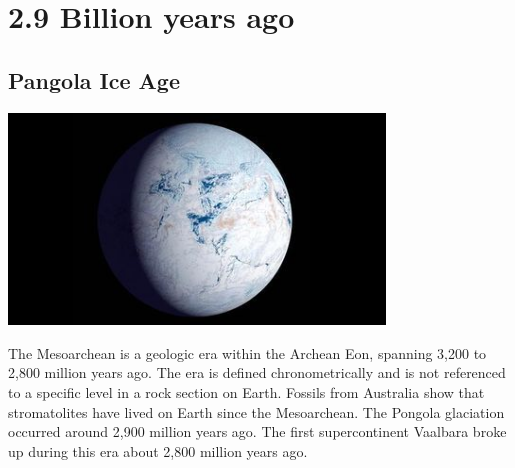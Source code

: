 \documentclass[11pt]{report}
\begin{document}

\chapter{2.9 Billion years ago}
\section{Pangola Ice Age}
\vspace{2mm}\begin{center}\includegraphics[width=10cm]{./img/iceage.jpg}\end{center}
The Mesoarchean is a geologic era within the Archean Eon, spanning 3,200 to 2,800 million years ago. The era is defined chronometrically and is not referenced to a specific level in a rock section on Earth. Fossils from Australia show that stromatolites have lived on Earth since the Mesoarchean. The Pongola glaciation occurred around 2,900 million years ago. The first supercontinent Vaalbara broke up during this era about 2,800 million years ago.
\end{document}
